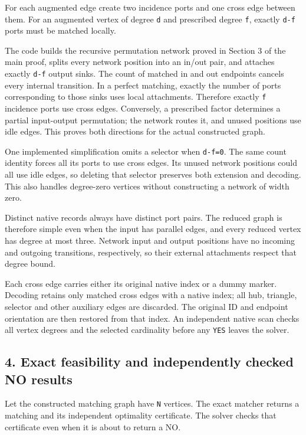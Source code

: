 For each augmented edge create two incidence ports and one cross edge between them. For an augmented vertex of degree \texttt{d} and prescribed degree \texttt{f}, exactly \texttt{d-f} ports must be matched locally.

The code builds the recursive permutation network proved in Section 3 of the main proof, splits every network position into an in/out pair, and attaches exactly \texttt{d-f} output sinks. The count of matched in and out endpoints cancels every internal transition. In a perfect matching, exactly the number of ports corresponding to those sinks uses local attachments. Therefore exactly \texttt{f} incidence ports use cross edges. Conversely, a prescribed factor determines a partial input-output permutation; the network routes it, and unused positions use idle edges. This proves both directions for the actual constructed graph.

One implemented simplification omits a selector when \texttt{d-f=0}. The same count identity forces all its ports to use cross edges. Its unused network positions could all use idle edges, so deleting that selector preserves both extension and decoding. This also handles degree-zero vertices without constructing a network of width zero.

Distinct native records always have distinct port pairs. The reduced graph is therefore simple even when the input has parallel edges, and every reduced vertex has degree at most three. Network input and output positions have no incoming and outgoing transitions, respectively, so their external attachments respect that degree bound.

Each cross edge carries either its original native index or a dummy marker. Decoding retains only matched cross edges with a native index; all hub, triangle, selector and other auxiliary edges are discarded. The original ID and endpoint orientation are then restored from that index. An independent native scan checks all vertex degrees and the selected cardinality before any \texttt{YES} leaves the solver.

\hypertarget{af-5f2ce72611-exact-feasibility-and-independently-checked-no-results}{%
\subsection{4. Exact feasibility and independently checked NO results}\label{af-5f2ce72611-exact-feasibility-and-independently-checked-no-results}}

Let the constructed matching graph have \texttt{N} vertices. The exact matcher returns a matching and its independent optimality certificate. The solver checks that certificate even when it is about to return a NO.

